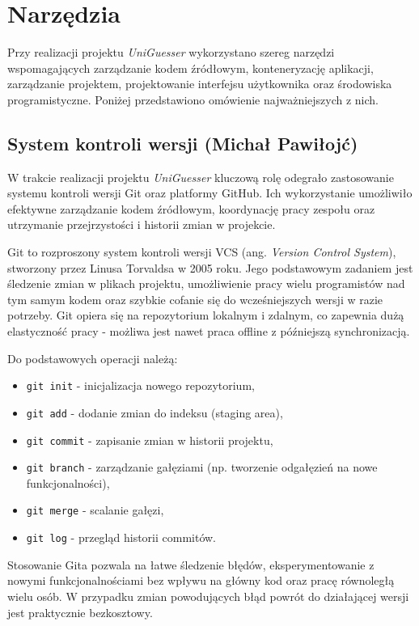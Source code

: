 \chapter{Narzędzia}
\label{chap:tools}

Przy realizacji projektu \textit{UniGuesser} wykorzystano szereg narzędzi wspomagających zarządzanie kodem źródłowym, konteneryzację aplikacji, zarządzanie projektem, projektowanie interfejsu użytkownika oraz środowiska programistyczne. Poniżej przedstawiono omówienie najważniejszych z nich.

\section{System kontroli wersji (Michał Pawiłojć)}

W trakcie realizacji projektu \textit{UniGuesser} kluczową rolę odegrało zastosowanie systemu kontroli wersji Git oraz platformy GitHub. Ich wykorzystanie umożliwiło efektywne zarządzanie kodem źródłowym, koordynację pracy zespołu oraz utrzymanie przejrzystości i historii zmian w projekcie.

Git to rozproszony system kontroli wersji VCS (ang. \textit{Version Control System}), stworzony przez Linusa Torvaldsa w 2005 roku. Jego podstawowym zadaniem jest śledzenie zmian w plikach projektu, umożliwienie pracy wielu programistów nad tym samym kodem oraz szybkie cofanie się do wcześniejszych wersji w razie potrzeby. Git opiera się na repozytorium lokalnym i zdalnym, co zapewnia dużą elastyczność pracy - możliwa jest nawet praca offline z późniejszą synchronizacją.

Do podstawowych operacji należą:

\begin{itemize}
    \item \texttt{git init} - inicjalizacja nowego repozytorium,
    \item \texttt{git add} - dodanie zmian do indeksu (staging area),
    \item \texttt{git commit} - zapisanie zmian w historii projektu,
    \item \texttt{git branch} - zarządzanie gałęziami (np. tworzenie odgałęzień na nowe funkcjonalności),
    \item \texttt{git merge} - scalanie gałęzi,
    \item \texttt{git log} - przegląd historii commitów.
\end{itemize}
Stosowanie Gita pozwala na łatwe śledzenie błędów, eksperymentowanie z nowymi funkcjonalnościami bez wpływu na główny kod oraz pracę równoległą wielu osób. W przypadku zmian powodujących błąd powrót do działającej wersji jest praktycznie bezkosztowy.

